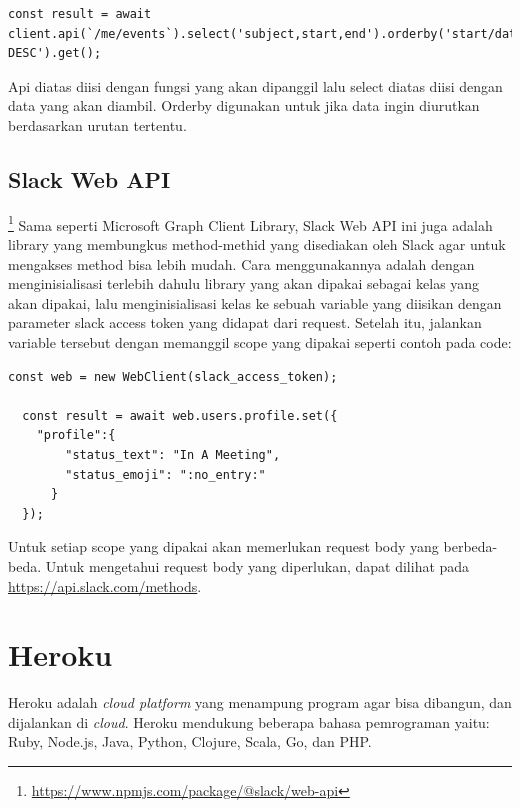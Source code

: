 \begin{lstlisting}
const result = await client.api(`/me/events`).select('subject,start,end').orderby('start/dateTime DESC').get();
\end{lstlisting}

Api diatas diisi dengan fungsi yang akan dipanggil lalu select diatas diisi dengan data yang akan diambil. Orderby digunakan untuk jika data ingin diurutkan berdasarkan urutan tertentu.

\subsection{Slack Web API}\footnote{\url{https://www.npmjs.com/package/@slack/web-api}}
Sama seperti Microsoft Graph Client Library, Slack Web API ini juga adalah library yang membungkus method-methid yang disediakan oleh Slack agar untuk mengakses method bisa lebih mudah. Cara menggunakannya adalah dengan menginisialisasi terlebih dahulu library yang akan dipakai sebagai kelas yang akan dipakai, lalu menginisialisasi kelas ke sebuah variable yang diisikan dengan parameter slack access token yang didapat dari request. Setelah itu, jalankan variable tersebut dengan memanggil scope yang dipakai seperti contoh pada code:

\begin{lstlisting}
const web = new WebClient(slack_access_token);

  const result = await web.users.profile.set({
    "profile":{
        "status_text": "In A Meeting",
        "status_emoji": ":no_entry:"
      }
  });
\end{lstlisting}

Untuk setiap scope yang dipakai akan memerlukan request body yang berbeda-beda. Untuk mengetahui request body yang diperlukan, dapat dilihat pada \url{https://api.slack.com/methods}. 

\section{Heroku}
Heroku adalah \textit{cloud platform} yang menampung program agar bisa dibangun, dan dijalankan di \textit{cloud}.\cite{heroku} Heroku mendukung beberapa bahasa pemrograman yaitu: Ruby, Node.js, Java, Python, Clojure, Scala, Go, dan PHP. 
